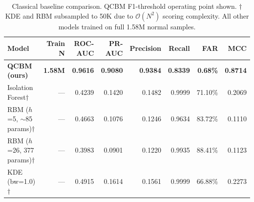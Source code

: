 \begin{table}[htbp]
\centering
\caption{Classical baseline comparison. QCBM F1-threshold operating point shown. $\dagger$ KDE and RBM subsampled to 50K due to $\mathcal{O}(N^2)$ scoring complexity. All other models trained on full 1.58M normal samples.}
\label{tab:classical_baselines}
\begin{tabular}{lrrrrrrr}
\toprule
\textbf{Model} & \textbf{Train N} & \textbf{ROC-AUC} & \textbf{PR-AUC} & \textbf{Precision} & \textbf{Recall} & \textbf{FAR} & \textbf{MCC} \\
\midrule
\textbf{\textbf{QCBM (ours)}} & \textbf{1.58M} & \textbf{\textbf{0.9616}} & \textbf{\textbf{0.9080}} & \textbf{\textbf{0.9384}} & \textbf{0.8339} & \textbf{0.68\%} & \textbf{\textbf{0.8714}} \\
Isolation Forest$\dagger$ & — & 0.4239 & 0.1420 & 0.1482 & 0.9999 & 71.10\% & 0.2069 \\
RBM ($h$=5, $\sim$85 params)$\dagger$ & — & 0.4663 & 0.1076 & 0.1246 & 0.9634 & 83.72\% & 0.1110 \\
RBM ($h$=26, 377 params)$\dagger$ & — & 0.3983 & 0.0901 & 0.1220 & 0.9935 & 88.41\% & 0.1123 \\
KDE (bw=1.0)$\dagger$ & — & 0.4915 & 0.1614 & 0.1561 & 0.9999 & 66.88\% & 0.2273 \\
\bottomrule
\end{tabular}
\end{table}